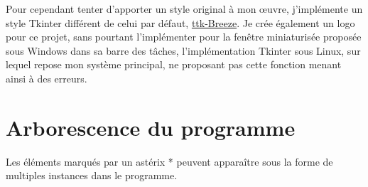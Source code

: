 \documentclass[a4]{article}
\begin{document}
Pour cependant tenter d'apporter un style original à mon \oe{}uvre, j'implémente un style Tkinter différent de celui par défaut, \href{https://github.com/MaxPerl/ttk-Breeze/tree/5872ff9bcec6aa7bcb9bd731422383a5d95f660d}{ttk-Breeze}. Je crée également un logo pour ce projet, sans pourtant l'implémenter pour la fenêtre miniaturisée proposée sous Windows dans sa barre des tâches, l'implémentation Tkinter sous Linux, sur lequel repose mon système principal, ne proposant pas cette fonction menant ainsi à des erreurs.

\section{Arborescence du programme}

Les éléments marqués par un astérix * peuvent apparaître sous la forme de multiples instances dans le programme. \\

\end{document}

